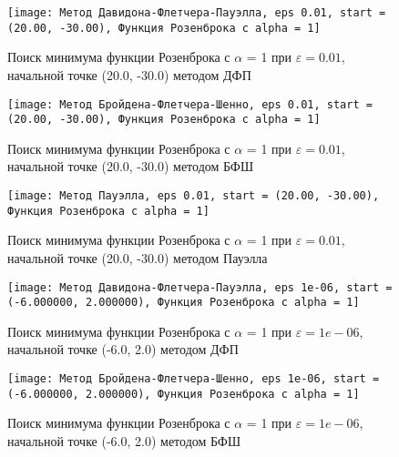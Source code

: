             \begin{figure}[H]
	        \centering
	        \texttt{[image: Метод Давидона-Флетчера-Пауэлла, eps 0.01, start = (20.00, -30.00), Функция Розенброка с alpha = 1]}%
	        \caption{Поиск минимума функции Розенброка с $\alpha$ = 1 при $\varepsilon = 0.01$, начальной точке (20.0, -30.0) методом ДФП}
	        \vspace*{-1.2cm}
            \end{figure}
            
            \begin{figure}[H]
	        \centering
	        \texttt{[image: Метод Бройдена-Флетчера-Шенно, eps 0.01, start = (20.00, -30.00), Функция Розенброка с alpha = 1]}%
	        \caption{Поиск минимума функции Розенброка с $\alpha$ = 1 при $\varepsilon = 0.01$, начальной точке (20.0, -30.0) методом БФШ}
	        \vspace*{-1.2cm}
            \end{figure}
            
            \begin{figure}[H]
	        \centering
	        \texttt{[image: Метод Пауэлла, eps 0.01, start = (20.00, -30.00), Функция Розенброка с alpha = 1]}%
	        \caption{Поиск минимума функции Розенброка с $\alpha$ = 1 при $\varepsilon = 0.01$, начальной точке (20.0, -30.0) методом Пауэлла}
	        \vspace*{-1.2cm}
            \end{figure}
            
            \begin{figure}[H]
	        \centering
	        \texttt{[image: Метод Давидона-Флетчера-Пауэлла, eps 1e-06, start = (-6.000000, 2.000000), Функция Розенброка с alpha = 1]}%
	        \caption{Поиск минимума функции Розенброка с $\alpha$ = 1 при $\varepsilon = 1e-06$, начальной точке (-6.0, 2.0) методом ДФП}
	        \vspace*{-1.2cm}
            \end{figure}
            
            \begin{figure}[H]
	        \centering
	        \texttt{[image: Метод Бройдена-Флетчера-Шенно, eps 1e-06, start = (-6.000000, 2.000000), Функция Розенброка с alpha = 1]}%
	        \caption{Поиск минимума функции Розенброка с $\alpha$ = 1 при $\varepsilon = 1e-06$, начальной точке (-6.0, 2.0) методом БФШ}
	        \vspace*{-1.2cm}
            \end{figure}
            
